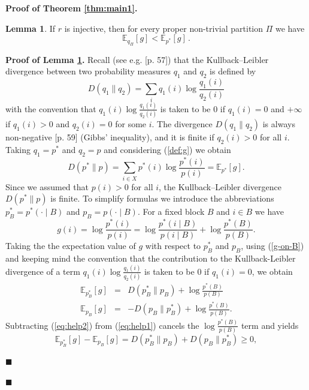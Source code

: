 \documentclass[10pt, letterpaper]{article}%
\theoremstyle{definition}
\newtheorem{lemma}[theorem]{Lemma}
\renewenvironment{proof}[1][\unskip]{%
\par
\noindent
\textbf{Proof #1.}
\noindent}
{\hfill$\blacksquare$

\bigskip}
\newcommand{\E}{\mathbb E}
\newcommand{\1}{\mathbf 1}
\def\change{\marginpar[\hfill Change]{Change}}
\begin{document}
\begin{proof}[of Theorem \ref{thm:main1}]
	\begin{lemma}\label{lem:KL}
		If $r$ is injective, then for every proper non-trivial partition $\Pi$ we have
		\[
			\E_{q_{\Pi}}[g] < \E_{p^*}[g]\,.
		\]
	\end{lemma}
	\begin{proof}[of Lemma \ref{lem:KL}]
		Recall (see e.g. \cite{Amari2016}[p. 57]) that the Kullback--Leibler divergence between two probability measures $q_1$ and $q_2$ is defined by
        \begin{equation}
         D(q_1\| q_2)=\sum_i q_1(i)\log\frac{q_1(i)}{q_2(i)}
  \end{equation}
        with the convention that $ q_1(i)\log\frac{q_1(i)}{q_2(i)}$ is taken to be 0 if $q_1(i)=0$ and $+\infty$ if $q_1(i)>0$ and $q_2(i)=0$ for some $i$. The divergence
        $D(q_1\| q_2)$ is always non-negative \cite{Amari2016}[p. 59] (Gibbs' inequality), and it is finite if $q_2(i)>0$ for all $i$. Taking $q_1=p^*$ and $q_2=p$ and considering (\ref{def:g}) we obtain
		\begin{equation}\label{eq:Div}
			D(p^*\|p)=\sum_{i\in X} p^*(i)\log\frac{p^*(i)}{p(i)}=\E_{p^*}[g].
		\end{equation}
        Since we assumed that $p(i)>0$ for all $i$, the Kullback--Leibler divergence $D(p^*\|p)$ is finite. 
		To simplify formulas we introduce the abbreviations $p^*_B=p^*(\cdot\mid B)$ and $p_B=p(\cdot\mid B)$. For a fixed block $B$ and $i\in B$ we have
		\begin{equation}\label{g-on-B}
		  g(i)=\log\frac{p^*(i)}{p(i)}
			=\log\frac{p^*(i\mid B)}{p(i\mid B)}+\log\frac{p^*(B)}{p(B)}.  
		\end{equation}
		Taking the %
        the expectation value of $g$ with respect to $p^*_B$ and $p_B$, using (\ref{g-on-B}) and keeping mind the convention that the contribution to the Kullback-Leibler divergence of a term $ q_1(i)\log\frac{q_1(i)}{q_2(i)}$ is taken to be 0 if $q_1(i)=0$, we obtain
		\begin{eqnarray}
			\E_{p^*_B}[g]&=&D(p^*_B\|p_B)+\log\frac{p^*(B)}{p(B)}\label{eq:help1}\\
			\E_{p_B}[g]&=&-D(p_B\|p^*_B)+\log\frac{p^*(B)}{p(B)}\label{eq:help2}.
		\end{eqnarray}
		Subtracting (\ref{eq:help2}) from (\ref{eq:help1}) cancels the $\log\frac{p^*(B)}{p(B)}$ term and yields
		\begin{equation}
			\E_{p^*_B}[g]-\E_{p_B}[g]=D(p^*_B\|p_B)+D(p_B\|p^*_B)\ge 0, \label{eq:kulonbseg}
		\end{equation}

\end{proof}
\end{proof}
\end{document}
